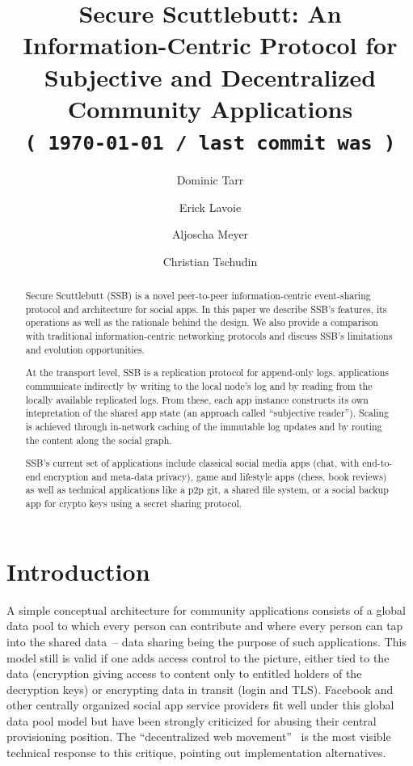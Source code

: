 \documentclass[sigconf]{acmart}
\title{Secure Scuttlebutt: An Information-Centric Protocol for
  Subjective and Decentralized Community Applications\\
\tt\small ( \today\ / last commit was )}
\author{Dominic Tarr}
\affiliation{ssb:@EMovhfIrFk4NihAKnRNhrf}
\author{Erick Lavoie}
\affiliation{McGill University, Montreal, Canada}
\author{Aljoscha Meyer}
\affiliation{TU Berlin, Germany}
\author{Christian Tschudin}
\affiliation{University of Basel, Switzerland}
\begin{document}
\begin{abstract}
  Secure Scuttlebutt (SSB) is a novel peer-to-peer information-centric
  event-sharing protocol and architecture for social apps. In this
  paper we describe SSB's features, its operations as well as the
  rationale behind the design. We also provide a comparison with
  traditional information-centric networking protocols and discuss
  SSB's limitations and evolution opportunities.

  At the transport level, SSB is a replication protocol for
  append-only logs.  applications communicate indirectly by writing to
  the local node's log and by reading from the locally available
  replicated logs. From these, each app instance constructs its own
  intepretation of the shared app state (an approach called
  ``subjective reader'').  Scaling is achieved through in-network
  caching of the immutable log updates and by routing the content
  along the social graph.

  SSB's current set of applications include classical social media
  apps (chat, with end-to-end encryption and meta-data privacy), game
  and lifestyle apps (chess, book reviews) as well as technical
  applications like a p2p git, a shared file system, or a social
  backup app for crypto keys using a secret sharing protocol.
\end{abstract}

\maketitle


\section{Introduction}

A simple conceptual architecture for community applications consists
of a global data pool to which every person can contribute and where
every person can tap into the shared data~-- data sharing being the
purpose of such applications. This model still is valid if one adds
access control to the picture, either tied to the data (encryption
giving access to content only to entitled holders of the decryption
keys) or encrypting data in transit (login and TLS). Facebook and
other centrally organized social app service providers fit well under
this global data pool model but have been strongly criticized for
abusing their central provisioning position.  The ``decentralized web
movement''~\cite{decent-2018-aug} is the most visible technical
response to this critique, pointing out implementation alternatives.
\end{document}
